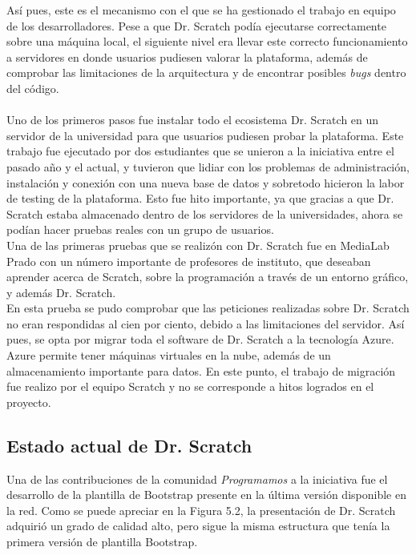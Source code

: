 \documentclass[a4paper, 12pt]{book}
\begin{document}
Así pues, este es el mecanismo con el que se ha gestionado el trabajo en equipo
de los desarrolladores. Pese a que Dr. Scratch podía ejecutarse correctamente
sobre una máquina local, el siguiente nivel era llevar este correcto funcionamiento 
a servidores en donde usuarios pudiesen valorar la plataforma, además de comprobar 
las limitaciones de la arquitectura y de encontrar posibles \emph{bugs} dentro del código. \\ \\

Uno de los primeros pasos fue instalar todo el ecosistema Dr. Scratch en un servidor de 
la universidad para que usuarios pudiesen probar la plataforma. Este trabajo fue 
ejecutado por dos estudiantes que se unieron a la iniciativa entre el pasado año y el 
actual, y tuvieron que lidiar con los problemas de administración, instalación y 
conexión con una nueva base de datos y sobretodo hicieron la labor de testing de la 
plataforma. Esto fue hito importante, ya que gracias a que Dr. Scratch estaba almacenado
dentro de los servidores de la universidades, ahora se podían hacer pruebas reales
con un grupo de usuarios. \\

Una de las primeras pruebas que se realizón con Dr. Scratch fue en MediaLab Prado con
un número importante de profesores de instituto, que deseaban aprender acerca de 
Scratch, sobre la programación a través de un entorno gráfico, y además Dr. Scratch. \\

En esta prueba se pudo comprobar que las peticiones realizadas sobre Dr. Scratch no 
eran respondidas al cien por ciento, debido a las limitaciones del servidor. Así pues,
se opta por migrar toda el software de Dr. Scratch a la tecnología Azure. \\

Azure permite tener máquinas virtuales en la nube, además de un almacenamiento importante
para datos. En este punto, el trabajo de migración fue realizo por el equipo Scratch y no
se corresponde a hitos logrados en el proyecto.


\subsection{Estado actual de Dr. Scratch}


Una de las contribuciones de la comunidad \emph{Programamos} a la iniciativa fue el 
desarrollo de la plantilla de Bootstrap presente en la última versión disponible en
la red. Como se puede apreciar en la Figura 5.2, la presentación de Dr. Scratch
adquirió un grado de calidad alto, pero sigue la misma estructura que tenía la primera
versión de plantilla Bootstrap. \\
\end{document}
